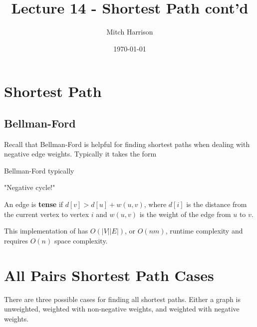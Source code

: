 \documentclass[titlepage, 12pt, leqno]{article}
\title{\Huge{Lecture 14 - Shortest Path cont'd}}
\author{\large{Mitch Harrison}}
\date{\today}
\begin{document}
\setlength{\parskip}{1\baselineskip}
\setlength{\parindent}{15pt}
\maketitle
\tableofcontents
\newpage


\section{Shortest Path}

\subsection{Bellman-Ford}
Recall that Bellman-Ford is helpful for finding shortest paths when dealing with
negative edge weights. Typically it takes the form
\begin{algorithm}
\caption{Bellman-Ford typically}
\begin{algorithmic}[1]
    \State {}
                \State {}
            \EndIf
        \EndFor
    \EndFor
            \State \Return "Negative cycle!"
        \EndIf
    \EndFor
\EndProcedure 
\end{algorithmic}
\end{algorithm}

\begin{definition}
    An edge is \textbf{tense} if $d[v]>d[u]+w(u,v)$, where $d[i]$ is the
    distance from the current vertex to vertex $i$ and $w(u,v)$ is the weight
    of the edge from $u$ to $v$.
\end{definition}

This implementation of  has $O(|V||E|)$, or $O(nm)$,
runtime complexity and requires $O(n)$ space complexity.

\pagebreak
\section{All Pairs Shortest Path Cases}
There are three possible cases for finding all shortest paths. Either a graph
is unweighted, weighted with non-negative weights, and weighted with negative
weights. 
\end{document}
